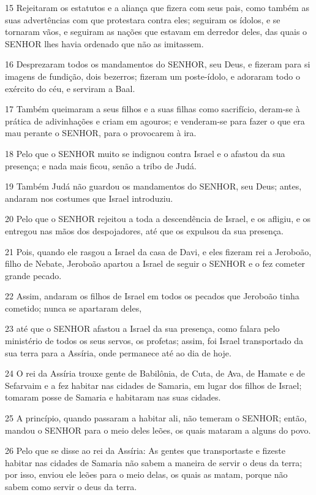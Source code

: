 \par 15 Rejeitaram os estatutos e a aliança que fizera com seus pais, como também as suas advertências com que protestara contra eles; seguiram os ídolos, e se tornaram vãos, e seguiram as nações que estavam em derredor deles, das quais o SENHOR lhes havia ordenado que não as imitassem.
\par 16 Desprezaram todos os mandamentos do SENHOR, seu Deus, e fizeram para si imagens de fundição, dois bezerros; fizeram um poste-ídolo, e adoraram todo o exército do céu, e serviram a Baal.
\par 17 Também queimaram a seus filhos e a suas filhas como sacrifício, deram-se à prática de adivinhações e criam em agouros; e venderam-se para fazer o que era mau perante o SENHOR, para o provocarem à ira.
\par 18 Pelo que o SENHOR muito se indignou contra Israel e o afastou da sua presença; e nada mais ficou, senão a tribo de Judá.
\par 19 Também Judá não guardou os mandamentos do SENHOR, seu Deus; antes, andaram nos costumes que Israel introduziu.
\par 20 Pelo que o SENHOR rejeitou a toda a descendência de Israel, e os afligiu, e os entregou nas mãos dos despojadores, até que os expulsou da sua presença.
\par 21 Pois, quando ele rasgou a Israel da casa de Davi, e eles fizeram rei a Jeroboão, filho de Nebate, Jeroboão apartou a Israel de seguir o SENHOR e o fez cometer grande pecado.
\par 22 Assim, andaram os filhos de Israel em todos os pecados que Jeroboão tinha cometido; nunca se apartaram deles,
\par 23 até que o SENHOR afastou a Israel da sua presença, como falara pelo ministério de todos os seus servos, os profetas; assim, foi Israel transportado da sua terra para a Assíria, onde permanece até ao dia de hoje.
\par 24 O rei da Assíria trouxe gente de Babilônia, de Cuta, de Ava, de Hamate e de Sefarvaim e a fez habitar nas cidades de Samaria, em lugar dos filhos de Israel; tomaram posse de Samaria e habitaram nas suas cidades.
\par 25 A princípio, quando passaram a habitar ali, não temeram o SENHOR; então, mandou o SENHOR para o meio deles leões, os quais mataram a alguns do povo.
\par 26 Pelo que se disse ao rei da Assíria: As gentes que transportaste e fizeste habitar nas cidades de Samaria não sabem a maneira de servir o deus da terra; por isso, enviou ele leões para o meio delas, os quais as matam, porque não sabem como servir o deus da terra.
